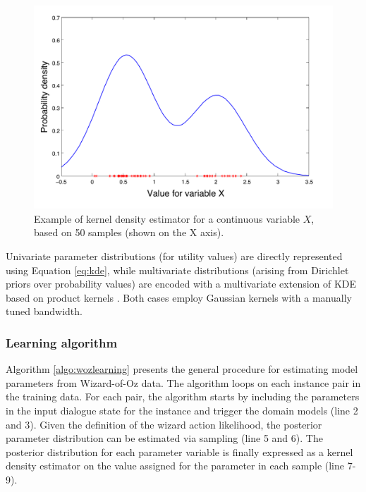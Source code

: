 \begin{figure}[h]
\centering
\includegraphics[scale=0.4]{imgs/kde.pdf} 
\caption{Example of kernel density estimator for a continuous variable $X$, based on 50 samples (shown on the X axis).}
\label{fig:kde}
\end{figure}

Univariate parameter distributions (for utility values) are directly represented using Equation \eqref{eq:kde}, while multivariate distributions (arising from Dirichlet priors over probability values) are encoded with a multivariate extension of KDE based on product kernels \citep{Silverman1986}.  Both cases employ Gaussian kernels with a manually tuned bandwidth. 


\subsubsection*{Learning algorithm}

Algorithm \ref{algo:wozlearning} presents the general procedure for estimating model parameters from Wizard-of-Oz data.  The algorithm loops on each instance pair in the training data.  For each pair, the algorithm starts by including the parameters in the input dialogue state for the 
instance and trigger the domain models (line 2 and 3). Given the definition of the wizard action likelihood, the posterior parameter distribution can be estimated via sampling (line 5 and 6).  The posterior distribution for each parameter variable is finally expressed as a kernel density estimator on the value assigned for the parameter in each sample (line 7-9). 

